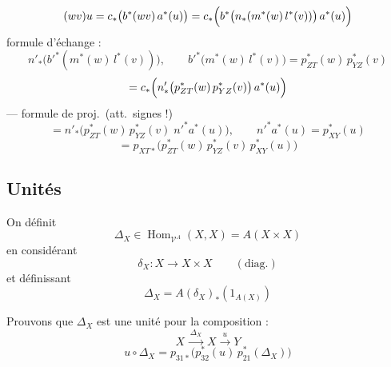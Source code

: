 \documentclass[11pt,a4paper]{article}
\begin{document}
\[
(wv)u = c_{*}\bigl( b^{*}(wv)\, a^{*}(u) \bigr)
= c_{*}\Bigl( b^{*}\bigl( n_{*}( m^{*}(w)\, l^{*}(v) ) \bigr)\, a^{*}(u) \Bigr)
\]
formule d'échange :
\[
n'_{*}\bigl( b'^{*}( m^{*}(w)\, l^{*}(v) ) \bigr),
\qquad b'^{*}\bigl( m^{*}(w)\, l^{*}(v) \bigr) = p_{ZT}^{*}(w)\, p_{YZ}^{*}(v)
\]
\[
= c_{*}\Bigl( n'_{*}\bigl( p_{ZT}^{*}(w)\, p_{YZ}^{*}(v) \bigr)\, a^{*}(u) \Bigr)
\]
--- formule de proj.\ (att.\ signes !)
\[
= n'_{*}\bigl( p_{ZT}^{*}(w)\, p_{YZ}^{*}(v)\; n'^{*} a^{*}(u) \bigr),
\qquad n'^{*}a^{*}(u) = p_{XY}^{*}(u)
\]
\[
= p_{XT*}\bigl( p_{ZT}^{*}(w)\, p_{YZ}^{*}(v)\, p_{XY}^{*}(u) \bigr)
\]



\subsection*{Unités}

On définit
\[ \Delta_{X} \in \operatorname{Hom}_{\mathcal{V}^{A}}(X,X) = A(X \times X) \]
en considérant
\[ \delta_{X} \colon X \to X \times X \qquad (\text{diag.}) \]
et définissant
\[ \Delta_{X} = A(\delta_{X})_{*}(1_{A(X)}) \]

Prouvons que $\Delta_{X}$ est une unité  pour la
composition : 
\[ X \xrightarrow{\;\Delta_{X}\;} X \xrightarrow{\;u\;} Y \]
\[ u \circ \Delta_{X} = p_{31*}\bigl( p_{32}^{*}(u)\, p_{21}^{*}(\Delta_{X}) \bigr) \]


\end{document}
